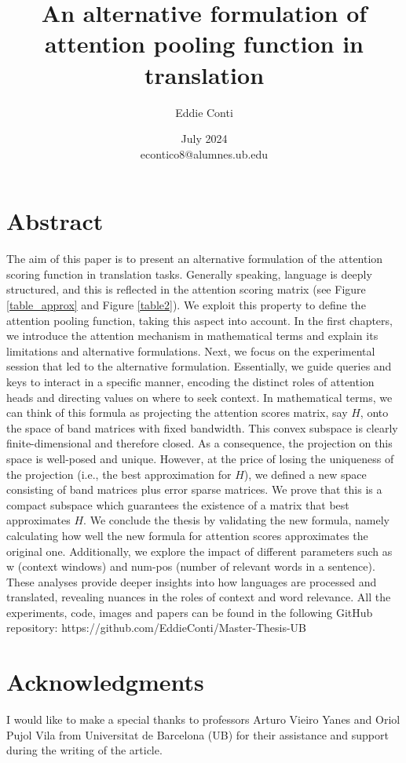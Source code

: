 \documentclass[11pt]{article}
\title{An alternative formulation of attention pooling function in translation}
\author{Eddie Conti}
\date{July 2024 \\
econtico8@alumnes.ub.edu}
\theoremstyle{plain}
\theoremstyle{remark}
\theoremstyle{definition}
\theoremstyle{plain}
\theoremstyle{plain}
\begin{document}
\maketitle
\section*{Abstract}
\small{
The aim of this paper is to present an alternative formulation of the attention scoring function in translation tasks. Generally speaking, language is deeply structured, and this is reflected in the attention scoring matrix (see Figure \ref{table_approx} and Figure \ref{table2}). We exploit this property to define the attention pooling function, taking this aspect into account. In the first chapters, we introduce the attention mechanism in mathematical terms and explain its limitations and alternative formulations. Next, we focus on the experimental session that led to the alternative formulation. Essentially, we guide queries and keys to interact in a specific manner, encoding the distinct roles of attention heads and directing values on where to seek context. In mathematical terms, we can think of this formula as projecting the attention scores matrix, say $H$, onto the space of band matrices with fixed bandwidth. This convex subspace is clearly finite-dimensional and therefore closed. As a consequence, the projection on this space is well-posed and unique. However, at the price of losing the uniqueness of the projection (i.e., the best approximation for $H$), we defined a new space consisting of band matrices plus error sparse matrices. We prove that this is a compact subspace which guarantees the existence of a matrix that best approximates $H$. We conclude the thesis by validating the new formula, namely calculating how well the new formula for attention scores approximates the original one. Additionally, we explore the impact of different parameters such as w (context windows) and num-pos (number of relevant words in a sentence). These analyses provide deeper insights into how languages are processed and translated, revealing nuances in the roles of context and word relevance.
\vskip2mm \noindent
All the experiments, code, images and papers can be found in the following GitHub repository: https://github.com/EddieConti/Master-Thesis-UB}
\normalsize{}
\section*{Acknowledgments}
I would like to make a special thanks to professors Arturo Vieiro Yanes and Oriol Pujol Vila from Universitat de Barcelona (UB) for their assistance and support during the writing of the article.
\end{document}

